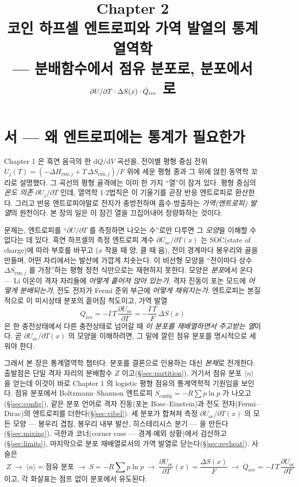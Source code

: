 \documentclass[11pt,a4paper]{article}
\title{\textbf{\LARGE Chapter 2}\\[0.35em]\Large 코인 하프셀 엔트로피와 가역 발열의 통계열역학\\[0.2em]\large — 분배함수에서 점유 분포로, 분포에서 $\partial U/\partial T\cdot\Delta S(x)\cdot\dot Q_\rev$ 로}
\author{}\date{}
\newcommand{\dd}{\mathrm{d}}
\newcommand{\rxn}{\mathrm{rxn}}
\newcommand{\rev}{\mathrm{rev}}
\newcommand{\oc}{\mathrm{oc}}
\newcommand{\config}{\mathrm{config}}
\newcommand{\avg}[1]{\langle #1\rangle}
\begin{document}
\maketitle

\section*{서 — 왜 엔트로피에는 통계가 필요한가}
Chapter 1 은 흑연 음극의 한 $\dd Q/\dd V$ 곡선을, 전이별 평형 중심 전위
$U_j(T)=(-\Delta H_{\rxn,j}+T\,\Delta S_{\rxn,j})/F$ 위에 세운 평형 종과 그 위에 얹힌 동역학 꼬리로
설명했다. 그 곡선의 평형 골격에는 이미 한 가지 ``열''이 잠겨 있다. 평형 중심의 \emph{온도 의존}
$\partial U_j/\partial T$ 인데, 열역학 1$\cdot$2법칙은 이 기울기를 곧장 반응 엔트로피로 환산한다. 그리고
반응 엔트로피야말로 전지가 충방전하며 흡수$\cdot$방출하는 \emph{가역(엔트로피) 발열}의 원천이다. 본 장의
일은 이 잠긴 열을 끄집어내어 정량화하는 것이다.

문제는, 엔트로피를 ``$\partial U/\partial T$ 를 측정하면 나오는 수''로만 다루면 그 \emph{모양}을 이해할 수
없다는 데 있다. 흑연 하프셀의 측정 엔트로피 계수 $\partial U_\oc/\partial T(x)$ 는 SOC(state of charge)에 따라 부호를 바꾸고
($x$ 작을 때 양, 클 때 음), 전이 경계마다 봉우리와 골을 만들며, 어떤 자리에서는 발산에 가깝게 치솟는다. 이
비선형 모양을 ``전이마다 상수 $\Delta S_{\rxn,j}$ 를 가정''하는 평형 정전 식만으로는 재현하지 못한다. 모양은
\emph{분포}에서 온다 — Li 이온이 격자 자리들에 \emph{어떻게 흩어져 앉아 있는가}, 격자 진동이 포논 모드에
\emph{어떻게 분배되는가}, 전도 전자가 Fermi 준위 부근에 \emph{어떻게 채워지는가}. 엔트로피는 본질적으로
이 미시상태 분포의 흩어짐 척도이고, 가역 발열
\[
\dot Q_\rev=-I\,T\,\frac{\partial U_\oc}{\partial T}=-\frac{I\,T}{F}\,\Delta S(x)
\]
은 한 충전상태에서 다른 충전상태로 넘어갈 때 \emph{이 분포를 재배열하면서 주고받는 열}이다. 곧
$\partial U_\oc/\partial T(x)$ 의 모양을 이해하려면, 그 밑에 깔린 점유 분포를 명시적으로 세워야 한다.

그래서 본 장은 통계열역학 챕터다. 분포를 결론으로 인용하는 대신 \emph{본체}로 전개한다. 출발점은 단일 격자
자리의 분배함수 $Z$ 이고(\S\ref{sec:partition}), 거기서 점유 분포 $\avg{n}$ 을 얻는데 이것이 바로 Chapter 1
의 logistic 평형 점유의 통계역학적 기원임을 보인다. 점유 분포에서 Boltzmann--Shannon 엔트로피
$S_\config=-R\sum p\ln p$ 가 나오고(\S\ref{sec:config}), 같은 분포 언어로 격자 진동(포논 Bose--Einstein)과
전도 전자(Fermi--Dirac)의 엔트로피를 더한다(\S\ref{sec:vibel}). 세 분포가 합쳐져 측정 $\partial U_\oc/\partial T(x)$
의 모든 모양 — 봉우리 겹침, 봉우리 내부 발산, 히스테리시스 분기 — 을 만든다
(\S\ref{sec:mixing}). 극한과 코너(corner case — 경계$\cdot$예외 상황)에서 검산하고(\S\ref{sec:limits}), 마지막으로 분포 재배열로서의 가역
발열로 닫는다(\S\ref{sec:revheat}). 사슬은
\[
\boxed{\;Z \;\to\; \avg{n}=\text{점유 분포}\;\to\; S=-R\textstyle\sum p\ln p \;\to\; \frac{\partial U_\oc}{\partial T}(x)=\frac{\Delta S(x)}{F}\;\to\;\dot Q_\rev=-I\,T\,\frac{\partial U_\oc}{\partial T}\;}
\]
이고, 각 화살표는 점프 없이 분포에서 유도된다.
\end{document}
